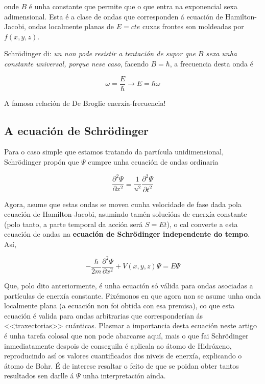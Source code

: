 \begin{refsection}
\begin{multicols}{2}
onde $B$ é unha constante que permite que o que entra na exponencial sexa
adimensional. Esta é a clase de ondas que corresponden á ecuación de
Hamilton-Jacobi, ondas localmente planas de $E=cte$ cuxas frontes son moldeadas
por $f(x,y,z)$.

Schrödinger di: \textit{un non pode resistir a tentación de supor que $B$ sexa
unha constante universal, porque nese caso}, facendo $B=\hbar$, a frecuencia
desta onda é

\begin{equation}
    \omega=\frac{E}{\hbar} \rightarrow \boxed{E=\hbar \omega}
\end{equation}

A famosa relación de De Broglie enerxía-frecuencia!

\subsection*{A ecuación de Schrödinger}

Para o caso simple que estamos tratando da partícula unidimensional,
Schrödinger propón que $\Psi$ cumpre unha ecuación de ondas ordinaria

\begin{equation}
        \frac{\partial^2 \Psi}{\partial x^2} =
        \frac{1}{u^2}\frac{\partial^2 \Psi}{\partial t^2}
\end{equation}

Agora, asume que estas ondas se moven cunha velocidade de fase dada pola
ecuación de Hamilton-Jacobi, asumindo tamén solucións de
enerxía constante (polo tanto, a parte temporal da acción será $S=Et$), o cal
converte a esta ecuación de ondas na \textbf{ecuación de Schrödinger
independente do tempo}. Así,

\begin{equation}
    \boxed{
        -\frac{\hbar}{2m}\frac{\partial^2\Psi}{\partial x^2} +
        V(x,y,z)\Psi = E\Psi
    }
\end{equation}

Que, polo dito anteriormente, é unha ecuación só válida para ondas asociadas a
partículas de enerxía constante. Fixémonos en que agora non se asume unha onda localmente
plana (a ecuación non foi obtida con esa premisa), co que esta ecuación é
valida para ondas arbitrarias que corresponderían ás <<traxectorias>>
cuánticas. Plasmar a importancia desta ecuación neste artigo é unha tarefa
colosal que non pode abarcarse aquí, mais o que fai Schrödinger inmediatamente
despois de conseguila é aplicala ao átomo de Hidróxeno, reproducindo así os
valores cuantificados dos niveis de enerxía, explicando o átomo de Bohr. É de
interese resaltar o feito de que se poidan obter tantos resultados sen darlle á
$\Psi$ unha interpretación aínda.


\nocite{schrodinger.e_1926}
\nocite{schrodinger.e_1926_2}
\nocite{hamilton_optico_mechanical}
\nocite{hamilton_jacobi_equation}

\printbibliography

\end{multicols}
\end{refsection}
